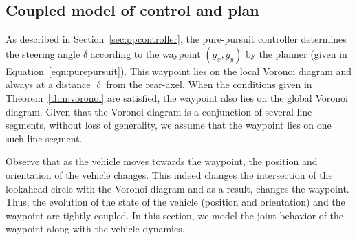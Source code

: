 \subsection{Coupled model of control and plan}
\label{sec:model}



As described in Section~\ref{sec:ppcontroller}, the pure-pursuit controller determines the steering angle $\delta$ according to the waypoint $(g_x, g_y)$ by the planner (given in Equation~\ref{eqn:purepursuit}). 
%
This waypoint lies on the local Voronoi diagram and always at a distance $\ell$ from the rear-axel. 
%
When the conditions given in Theorem~\ref{thm:voronoi} are satisfied, the waypoint also lies on the global Voronoi diagram.
%
Given that the Voronoi diagram is a conjunction of several line segments, without loss of generality, we assume that the waypoint lies on one such line segment.
%

Observe that as the vehicle moves towards the waypoint, the position and orientation of the vehicle changes.
%
This indeed changes the intersection of the lookahead circle with the Voronoi diagram and as a result, changes the waypoint.
%
Thus, the evolution of the state of the vehicle (position and orientation) and the waypoint are tightly coupled.
%
In this section, we model the joint behavior of the waypoint along with the vehicle dynamics.
%


